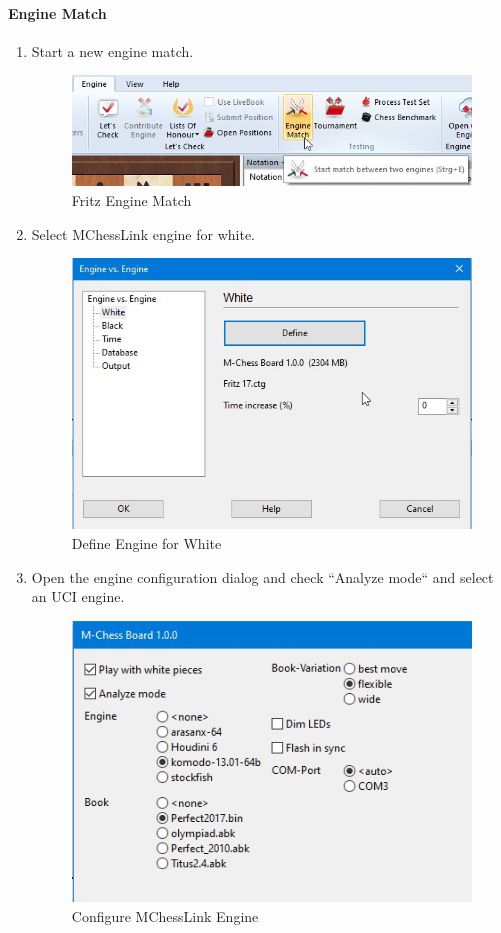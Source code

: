 \documentclass[11pt,a4paper]{article}
\begin{document}
\paragraph{Engine Match}
\begin{enumerate}
	\item Start a new engine match.
	\begin{figure}[H]
		\centering
		\includegraphics[scale=0.6]{fritz_enginematch.jpg}
		\caption{Fritz Engine Match}
		\label{fig:FritzEngineMatch}
	\end{figure}
	\item Select MChessLink engine for white.
	\begin{figure}[H]
		\centering
		\includegraphics[scale=0.6]{fritz_enginewhite.jpg}
		\caption{Define Engine for White}
		\label{fig:FritzEngineWhite}
	\end{figure}
	\item Open the engine configuration dialog and check ``Analyze mode`` and select an UCI engine.
	\begin{figure}[H]
		\centering
		\includegraphics[scale=0.8]{fritz_engine_configure_mchesslink_analyze.jpg}
		\caption{Configure MChessLink Engine}
		\label{fig:FritzConfigureCertabo}
	\end{figure}
	

\end{enumerate}
\end{document}
